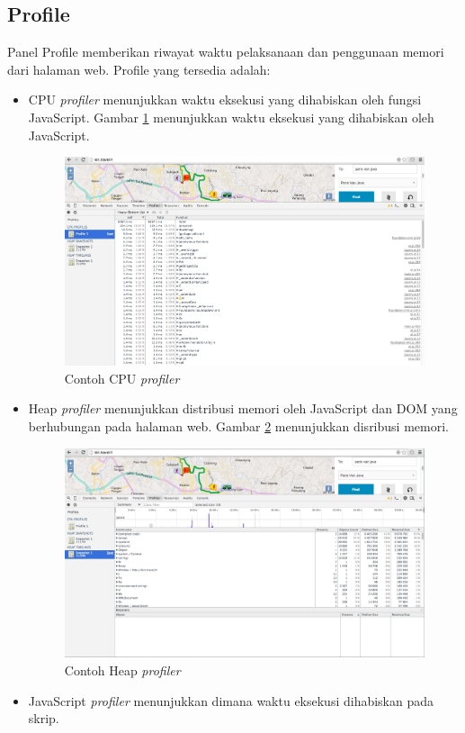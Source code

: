 \subsection{Profile}
Panel Profile memberikan riwayat waktu pelaksanaan dan penggunaan memori dari halaman web. Profile yang tersedia adalah:
\begin{itemize}
	\item CPU \textit{profiler} menunjukkan waktu eksekusi yang dihabiskan oleh fungsi JavaScript. Gambar \ref{fig:2_devtools_profile_cpu} menunjukkan waktu eksekusi yang dihabiskan oleh JavaScript.
			\begin{figure}[H]
				\centering
				\includegraphics[scale=0.3]{Gambar/devtools-profile-cpu}
				\caption{Contoh CPU \textit{profiler}} 
				\label{fig:2_devtools_profile_cpu}
			\end{figure}
	\item Heap \textit{profiler} menunjukkan distribusi memori oleh JavaScript dan DOM yang berhubungan pada halaman web. Gambar \ref{fig:2_devtools_profile_heap} menunjukkan disribusi memori. 
			\begin{figure}[H]
				\centering
				\includegraphics[scale=0.3]{Gambar/devtools-profile-heap}
				\caption{Contoh Heap \textit{profiler}} 
				\label{fig:2_devtools_profile_heap}
			\end{figure}
	\item JavaScript \textit{profiler} menunjukkan dimana waktu eksekusi dihabiskan pada skrip.
\end{itemize}